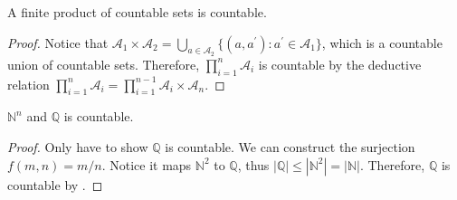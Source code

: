 \begin{proposition}
    A finite product of countable sets is countable.
\end{proposition}
\begin{proof}
        Notice that $\mathcal{A}_1 \times \mathcal{A}_2 = \bigcup_{a \in \mathcal{A}_2} \{(a,a^{\prime}):a^{\prime} \in \mathcal{A}_1\}$, which is a countable union of countable sets. Therefore, $\prod_{i = 1}^n \mathcal{A}_i$ is countable by the deductive relation $\prod_{i=1}^n \mathcal{A}_i =\prod_{i=1}^{n-1} \mathcal{A}_i \times \mathcal{A}_n$.
\end{proof}
\begin{corollary}
    $\mathbb{N}^n$ and $\mathbb{Q}$ is countable.
\end{corollary}
\begin{proof}
    Only have to show $\mathbb{Q}$ is countable. We can construct the surjection $f(m,n) =m/n$. Notice it maps $\mathbb{N}^2$ to $\mathbb{Q}$, thus $|\mathbb{Q}| \leq |\mathbb{N}^2| = |\mathbb{N}|$. Therefore, $\mathbb{Q}$ is countable by .
\end{proof}

